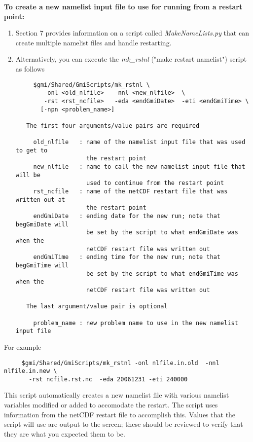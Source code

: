 \vskip 1.0cm

\noindent
{\bf To create a new namelist input file to use for running from a
restart point:}
%
\begin{enumerate}
\item Section 7 provides information on a script called {\em MakeNameLists.py} that
can create multiple namelist files and handle restarting.
\item Alternatively, you can execute the {\em mk\_rstnl}
      ("make restart namelist") script as follows
\begin{verbatim}
     $gmi/Shared/GmiScripts/mk_rstnl \
        -onl <old_nlfile>   -nnl <new_nlfile>  \
        -rst <rst_ncfile>   -eda <endGmiDate>  -eti <endGmiTime> \
       [-npn <problem_name>]

   The first four arguments/value pairs are required

     old_nlfile   : name of the namelist input file that was used to get to
                    the restart point
     new_nlfile   : name to call the new namelist input file that will be
                    used to continue from the restart point
     rst_ncfile   : name of the netCDF restart file that was written out at
                    the restart point
     endGmiDate   : ending date for the new run; note that begGmiDate will 
                    be set by the script to what endGmiDate was when the 
                    netCDF restart file was written out
     endGmiTime   : ending time for the new run; note that begGmiTime will 
                    be set by the script to what endGmiTime was when the 
                    netCDF restart file was written out

   The last argument/value pair is optional

     problem_name : new problem name to use in the new namelist input file
\end{verbatim}
\end{enumerate}
%
For example
\begin{verbatim}
     $gmi/Shared/GmiScripts/mk_rstnl -onl nlfile.in.old  -nnl nlfile.in.new \
       -rst ncfile.rst.nc  -eda 20061231 -eti 240000
\end{verbatim}
%
This script automatically creates a new namelist file with various namelist
variables modified or added to accomodate the restart.  The script uses
 information from the netCDF restart file to accomplish this.  Values that
the script will use are output to the screen; these should be reviewed to
verify that they are what you expected them to be.
